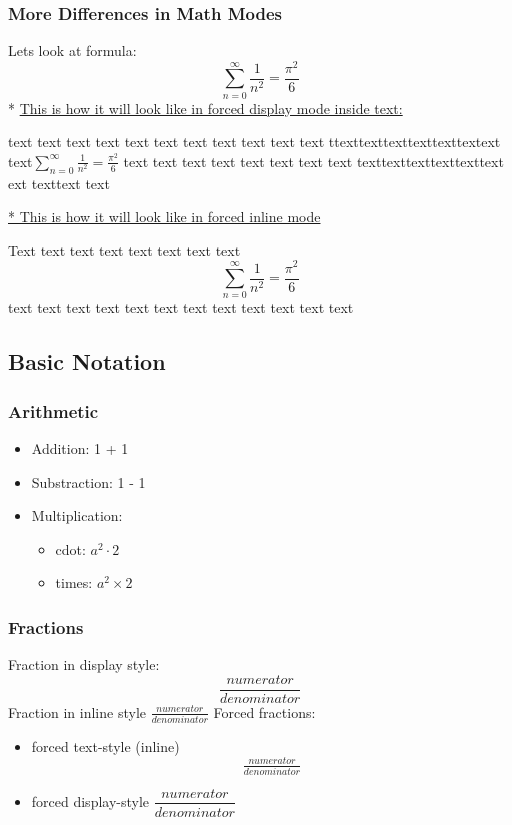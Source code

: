 \documentclass{article}
\begin{document}
\subsubsection{More Differences in Math Modes}
Lets look at formula:
    \begin{equation*}
        \sum_{n=0}^\infty \frac{1}{n^2} = \frac{\pi^2}{6}
    \end{equation*}
* \uline{This is how it will look like in forced display mode inside text:}

text text text  text text text text text text text text ttexttexttexttexttexttextext text\(\displaystyle \sum_{n=0}^\infty \frac{1}{n^2} = \frac{\pi^2}{6}\) text text text text text text text text texttexttexttexttexttext
ext texttext text

\uline{* This is how it will look like in forced inline mode}

Text text  text text text text text text \[\textstyle \sum_{n=0}^\infty \frac{1}{n^2} = \frac{\pi^2}{6}\] text  text  text  text  text  text  text  text  text  text  text  text 

\subsection{Basic Notation}\label{subsec:basic-notation}

\subsubsection{Arithmetic}
\begin{itemize}
    \item Addition: 1 + 1
    \item Substraction: 1 - 1
    \item Multiplication:
    \begin{itemize}
        \item cdot: \(a^2 \cdot 2 \)
        \item times: \(a^2 \times 2\) 
    \end{itemize}
\end{itemize}

\subsubsection{Fractions}
Fraction in display style: \[\frac{numerator}{denominator}\]
\noindent
Fraction in inline style \(\frac{numerator}{denominator}\)
Forced fractions:
\begin{itemize}
    \item forced text-style (inline) \[\tfrac{numerator}{denominator}\]
    \item forced display-style \(\dfrac{numerator}{denominator}\)
\end{itemize}
 
\end{document}
